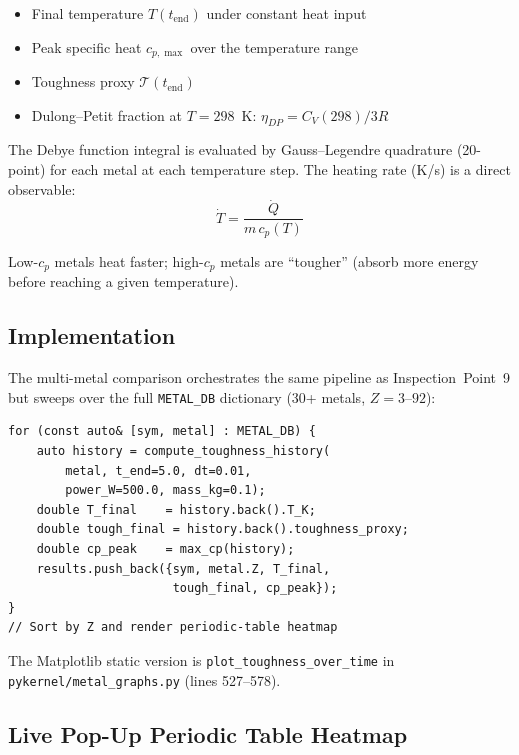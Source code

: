 \documentclass[11pt,a4paper]{article}
\begin{document}
\begin{itemize}
  \item Final temperature $T(t_{\text{end}})$ under constant heat input
  \item Peak specific heat $c_{p,\max}$ over the temperature range
  \item Toughness proxy $\mathcal{T}(t_{\text{end}})$
  \item Dulong--Petit fraction at $T = 298$~K:
    $\eta_{DP} = C_V(298) / 3R$
\end{itemize}

The Debye function integral is evaluated by Gauss--Legendre quadrature
(20-point) for each metal at each temperature step.  The heating rate
(K/s) is a direct observable:
\begin{equation}
  \dot{T} = \frac{\dot{Q}}{m\,c_{p}(T)}
  \label{eq:heating_rate}
\end{equation}

Low-$c_p$ metals heat faster; high-$c_p$ metals are ``tougher''
(absorb more energy before reaching a given temperature).

\subsection{Implementation}

The multi-metal comparison orchestrates the same pipeline as
Inspection~Point~9 but sweeps over the full \texttt{METAL\_DB} dictionary
(30+ metals, $Z = 3\text{--}92$):

\begin{lstlisting}[style=cpp,title={\textbf{Multi-metal sweep concept}}]
for (const auto& [sym, metal] : METAL_DB) {
    auto history = compute_toughness_history(
        metal, t_end=5.0, dt=0.01,
        power_W=500.0, mass_kg=0.1);
    double T_final    = history.back().T_K;
    double tough_final = history.back().toughness_proxy;
    double cp_peak    = max_cp(history);
    results.push_back({sym, metal.Z, T_final,
                       tough_final, cp_peak});
}
// Sort by Z and render periodic-table heatmap
\end{lstlisting}

The Matplotlib static version is \texttt{plot\_toughness\_over\_time}
in \texttt{pykernel/metal\_graphs.py} (lines 527--578).

\subsection{Live Pop-Up Periodic Table Heatmap}
\end{document}
